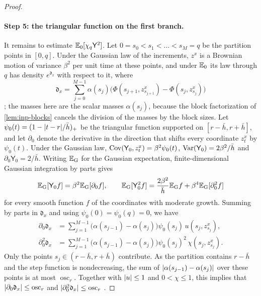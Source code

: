\begin{proof}
\paragraph{Step 5: the triangular function on the first branch.} It remains to estimate $\mathbb E_0[\chi_q\mathsf Y^2]$. Let $0=s_0<s_1<\dots<s_M=q$ be the partition points in $[0,q]$. Under the Gaussian law of the increments, $z^x$ is a Brownian motion of variance $\beta^2$ per unit time at these points, and under $\mathbb E_0$ its law through $q$ has density $e^{\mathfrak d_x}$ with respect to it, where
\[
 \mathfrak d_x=\sum_{j=0}^{M-1}\alpha(s_j)\bigl(\Phi(s_{j+1},z^x_{s_{j+1}})-\Phi(s_j,z^x_{s_j})\bigr)
\]
\cite[(7.21)]{oai-barriers}; the masses here are the scalar masses $\alpha(s_j)$, because the block factorization of \cref{lem:inp-blocks} cancels the division of the masses by the block sizes. Let $\psi_0(t)=(1-\lvert t-r\rvert/\bar h)_+$ be the triangular function supported on $[r-\bar h,r+\bar h]$, and let $\partial_0$ denote the derivative in the direction that shifts every coordinate $z^x_t$ by $\psi_0(t)$. Under the Gaussian law, $\operatorname{Cov}(\mathsf Y_0,z^x_t)=\beta^2\psi_0(t)$, $\operatorname{Var}(\mathsf Y_0)=2\beta^2/\bar h$ and $\partial_0\mathsf Y_0=2/\bar h$. Writing $\mathbb E_{\rm G}$ for the Gaussian expectation, finite-dimensional Gaussian integration by parts gives
\begin{equation}\label{eq:st-tent-ibp}
 \mathbb E_{\rm G}[\mathsf Y_0f]=\beta^2\mathbb E_{\rm G}[\partial_0f],\qquad
 \mathbb E_{\rm G}[\mathsf Y_0^2f]=\frac{2\beta^2}{\bar h}\mathbb E_{\rm G}f+\beta^4\mathbb E_{\rm G}[\partial_0^2f]
\end{equation}
for every smooth function $f$ of the coordinates with moderate growth. Summing by parts in $\mathfrak d_x$ and using $\psi_0(0)=\psi_0(q)=0$, we have
\begin{align*}
 \partial_0\mathfrak d_x&=\sum_{j=1}^{M-1}\bigl(\alpha(s_{j-1})-\alpha(s_j)\bigr)\psi_0(s_j)\,u(s_j,z^x_{s_j}),\\
 \partial_0^2\mathfrak d_x&=\sum_{j=1}^{M-1}\bigl(\alpha(s_{j-1})-\alpha(s_j)\bigr)\psi_0(s_j)^2\,\chi(s_j,z^x_{s_j}).
\end{align*}
Only the points $s_j\in(r-\bar h,r+\bar h)$ contribute. As the partition contains $r-\bar h$ and the step function is nondecreasing, the sum of $\lvert \alpha(s_{j-1})-\alpha(s_j)\rvert$ over these points is at most $\operatorname{osc}_r$. Together with $\lvert u\rvert\le1$ and $0<\chi\le1$, this implies that $\lvert \partial_0\mathfrak d_x\rvert\le\operatorname{osc}_r$ and $\lvert \partial_0^2\mathfrak d_x\rvert\le\operatorname{osc}_r$ \cite[(7.23)]{oai-barriers}.


\end{proof}
